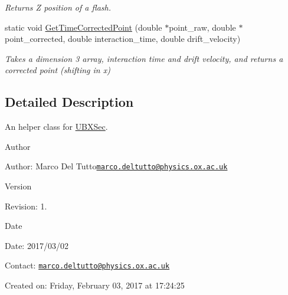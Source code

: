 \begin{DoxyCompactItemize}
\begin{DoxyCompactList}\small\item\em Returns Z position of a flash. \end{DoxyCompactList}\item 
static void \hyperlink{classUBXSecHelper_a44a38546ab8f9a473f0957af008219d4}{Get\-Time\-Corrected\-Point} (double $\ast$point\-\_\-raw, double $\ast$point\-\_\-corrected, double interaction\-\_\-time, double drift\-\_\-velocity)
\begin{DoxyCompactList}\small\item\em Takes a dimension 3 array, interaction time and drift velocity, and returns a corrected point (shifting in x) \end{DoxyCompactList}\end{DoxyCompactItemize}


\subsection{Detailed Description}
An helper class for \hyperlink{classUBXSec}{U\-B\-X\-Sec}. 

\begin{DoxyAuthor}{Author}

\end{DoxyAuthor}
\begin{DoxyParagraph}{Author\-:}
Marco Del Tutto\href{mailto:marco.deltutto@physics.ox.ac.uk}{\tt marco.\-deltutto@physics.\-ox.\-ac.\-uk} 
\end{DoxyParagraph}


\begin{DoxyVersion}{Version}

\end{DoxyVersion}
\begin{DoxyParagraph}{Revision\-:}
1. 
\end{DoxyParagraph}


\begin{DoxyDate}{Date}

\end{DoxyDate}
\begin{DoxyParagraph}{Date\-:}
2017/03/02 
\end{DoxyParagraph}


Contact\-: \href{mailto:marco.deltutto@physics.ox.ac.uk}{\tt marco.\-deltutto@physics.\-ox.\-ac.\-uk}

Created on\-: Friday, February 03, 2017 at 17\-:24\-:25 

